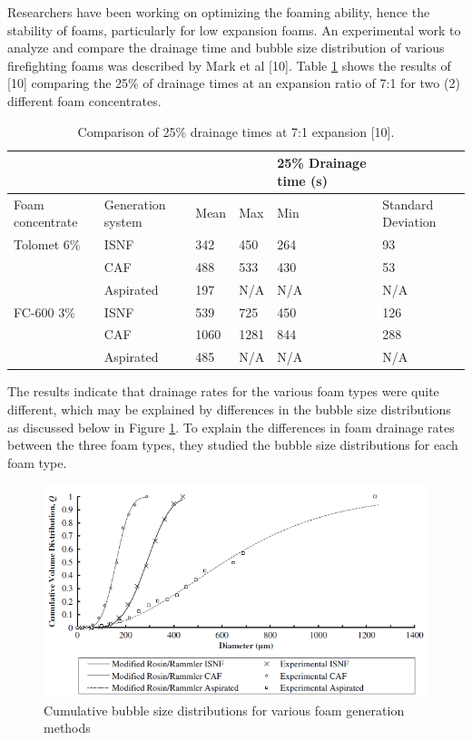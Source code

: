 \documentclass[12pt]{report}
\begin{document}
Researchers have been working on optimizing the foaming ability, hence the stability of foams, particularly for low expansion foams.  An experimental work to analyze and compare the drainage time and bubble size distribution of various firefighting foams was described by Mark et al [10]. Table \ref{ch2:table:times} shows the results of [10] comparing the 25\% of drainage times at an expansion ratio of 7:1 for two (2) different foam concentrates. \\

\begin{table}[H]
\caption{Comparison of 25\% drainage times at 7:1 expansion [10].}   

\centering
\begin{tabular}{m{5em} m{5em} m{4em} m{4em} m{4em} m{5em}}
    \hline
    & & & & 25\% Drainage time (s) \\
    \hline
    Foam concentrate & Generation system & Mean & Max & Min & Standard Deviation \\ 
    Tolomet 6\% & ISNF & 342 & 450 & 264 & 93 \\
    & CAF & 488 & 533 & 430 & 53 \\
    & Aspirated & 197 & N/A & N/A & N/A \\
    FC-600 3\% & ISNF & 539 & 725 & 450 & 126 \\
    & CAF & 1060 & 1281 & 844 & 288 \\
    & Aspirated & 485 & N/A & N/A & N/A \\
    \hline
\end{tabular}

\label{ch2:table:times}
\end{table}

The results indicate that drainage rates for the various foam types were quite different, which may be explained by differences in the bubble size distributions as discussed below in Figure \ref{ch2:figure:distributions}. To explain the differences in foam drainage rates between the three foam types, they studied the bubble size distributions for each foam type.

\begin{figure}[H]
    \centering
    \includegraphics[width=\textwidth]{bubble_size_distributions.png}
    \caption{Cumulative bubble size distributions for various foam generation methods}
    \label{ch2:figure:distributions}
\end{figure}
\end{document}

